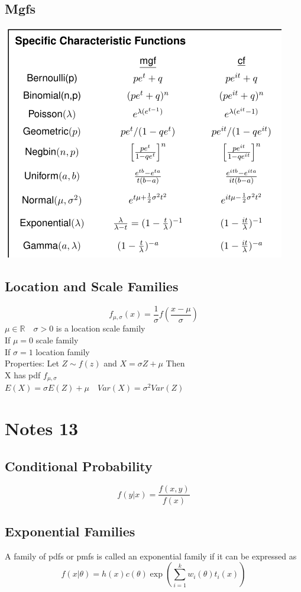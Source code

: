 \documentclass[openany]{book}
\begin{document}
\section{Mgfs}
\includegraphics[scale=1]{mgfchar.png}
\section{Location and Scale Families}
\[f_{\mu,\sigma}(x)=\dfrac{1}{\sigma}f\left(\dfrac{x-\mu}{\sigma} \right)
\]
$\mu \in \mathbb{R} \quad \sigma>0$ is a location scale family\\
If $\mu=0$ scale family\\
If $\sigma=1$ location family\\
Properties: Let $Z\sim f(z)$ and $X=\sigma Z+\mu$ Then\\
X has pdf $f_{\mu,\sigma}$\\
$E(X)=\sigma E(Z)+\mu \quad Var(X)=\sigma^2 Var(Z)$

\chapter{Notes 13}
\section{Conditional Probability}
\[f(y|x)=\dfrac{f(x,y)}{f(x)}
\]
\section{Exponential Families}
A family of pdfs or pmfs is called an exponential family if it can be expressed as
\[f(x|\theta)=h(x)c(\theta)\exp\left(\sum_{i=1}^{k}w_i(\theta)t_i(x)\right)
\]
\end{document}
